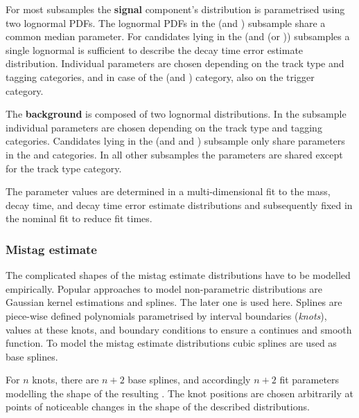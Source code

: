 For most subsamples the \textbf{signal} component's distribution is parametrised
using two lognormal \acp{PDF}. The lognormal \acp{PDF} in the (\catLL and
\catOS) subsample share a common median parameter. For candidates lying in the
(\catLL and (\catSS or \catBS)) subsamples a single lognormal \PDF is sufficient
to describe the decay time error estimate distribution. Individual parameters
are chosen depending on the track type and tagging categories, and in case of
the (\catDD and \catOS) category, also on the trigger category.

The \textbf{background} \PDF is composed of two lognormal distributions. In the
\catLL subsample individual parameters are chosen depending on the track type
and tagging categories. Candidates lying in the (\catDD and \catOS and \catAU)
subsample only share parameters in the \catOO and \catOT categories. In all
other subsamples the parameters are shared except for the track type category.

The parameter values are determined in a multi-dimensional fit to the mass,
decay time, and decay time error estimate distributions and subsequently fixed
in the nominal fit to reduce fit times.

\subsubsection{Mistag estimate}
\label{sec:measurement_of_sin2beta:likelihood_fit:model:mistag}

The complicated shapes of the mistag estimate distributions have to be modelled
empirically. Popular approaches to model non-parametric distributions are \eg
Gaussian kernel estimations and splines. The later one is used here. Splines are
piece-wise defined polynomials parametrised by interval boundaries
(\emph{knots}), values at these knots, and boundary conditions to ensure a
continues and smooth function. To model the mistag estimate distributions cubic
splines are used as base splines.

For $n$ knots, there are $n+2$ base splines, and accordingly $n+2$ fit
parameters modelling the shape of the resulting \PDF. The knot positions are
chosen arbitrarily at points of noticeable changes in the shape of the described
distributions.

